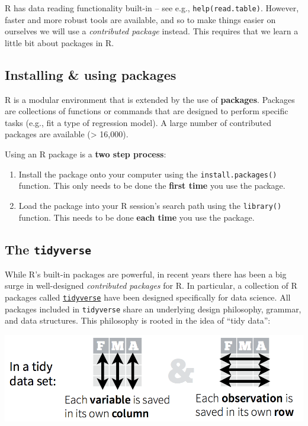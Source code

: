 \documentclass[
]{book}
\begin{document}
R has data reading functionality built-in -- see e.g., \texttt{help(read.table)}. However, faster and more robust tools are available, and so to make things easier on ourselves we will use a \emph{contributed package} instead. This requires that we learn a little bit about packages in R.

\hypertarget{installing-using-packages}{%
\subsection{Installing \& using packages}\label{installing-using-packages}}

R is a modular environment that is extended by the use of \textbf{packages}. Packages are collections of functions or commands that are designed to perform specific tasks (e.g., fit a type of regression model). A large number of contributed packages are available (\textgreater{} 16,000).

Using an R package is a \textbf{two step process}:

\begin{enumerate}
\def\labelenumi{\arabic{enumi}.}
\item
  Install the package onto your computer using the \texttt{install.packages()} function. This only needs to be done the \textbf{first time} you use the package.
\item
  Load the package into your R session's search path using the \texttt{library()} function. This needs to be done \textbf{each time} you use the package.
\end{enumerate}

\hypertarget{the-tidyverse}{%
\subsection{\texorpdfstring{The \texttt{tidyverse}}{The tidyverse}}\label{the-tidyverse}}

While R's built-in packages are powerful, in recent years there has been a big surge in well-designed \emph{contributed packages} for R. In particular, a collection of R packages called \href{https://www.tidyverse.org/}{\texttt{tidyverse}} have been designed specifically for data science. All packages included in \texttt{tidyverse} share an underlying design philosophy, grammar, and data structures. This philosophy is rooted in the idea of ``tidy data'':

\includegraphics{R/Rintro/images/tidy_data.png}
\end{document}
